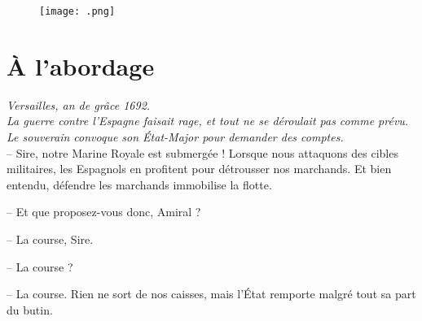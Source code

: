     \vspace{1cm} \begin{figure}[!h] \centering \texttt{[image: .png]} \caption{} \end{figure}
\fi


\newcommand{\culdelampe}[0]{\begin{center}
*

* *\end{center}}



\section{À l'abordage}

\textit{Versailles, an de grâce 1692.}\\

\textit{La guerre contre l'Espagne faisait rage, et tout ne se déroulait pas comme prévu. Le souverain convoque son État-Major pour demander des comptes.}\\

-- Sire, notre Marine Royale est submergée ! Lorsque nous attaquons
   des cibles militaires, les Espagnols en profitent pour détrousser
   nos marchands. Et bien entendu, défendre les marchands immobilise
   la flotte.

-- Et que proposez-vous donc, Amiral ?

-- La course, Sire.

-- La course ?

-- La course. Rien ne sort de nos caisses, mais l'État remporte malgré
   tout sa part du butin.

